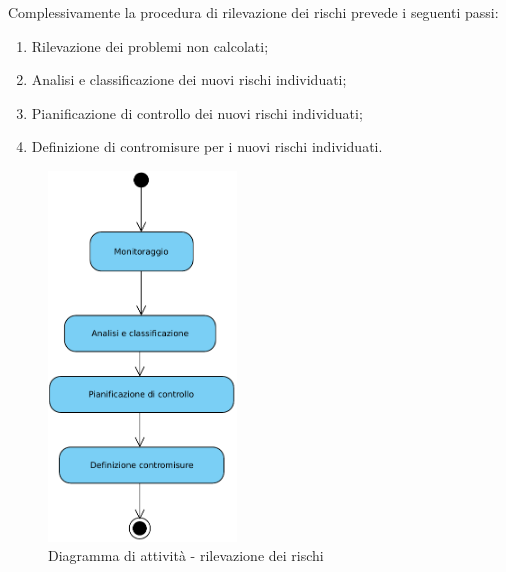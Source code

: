 Complessivamente la procedura di rilevazione dei rischi prevede i seguenti passi:
\begin{enumerate}
\item Rilevazione dei problemi non calcolati;
\item Analisi e classificazione dei nuovi rischi individuati;
\item Pianificazione di controllo dei nuovi rischi individuati;
\item Definizione di contromisure per i nuovi rischi individuati.
\end{enumerate}
\begin{figure}[H]
\centering
\includegraphics[width=5cm]{../immagini/analisiRischi.pdf}
\caption{Diagramma di attività - rilevazione dei rischi}
\label{fig:rilevazione rischi}
\end{figure}
